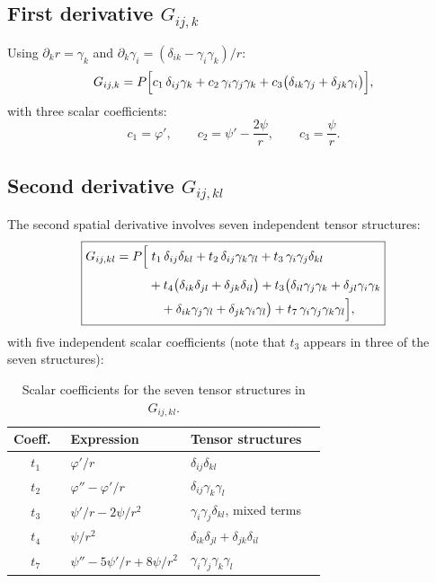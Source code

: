 \documentclass[11pt,a4paper]{article}
\begin{document}
\subsection{First derivative \texorpdfstring{$G_{ij,k}$}{G\_ij,k}}

Using $\partial_k r = \gamma_k$ and
$\partial_k \gamma_i = (\delta_{ik} - \gamma_i\gamma_k)/r$:
\begin{equation}
  G_{ij,k} = P\Bigl[
    c_1\,\delta_{ij}\gamma_k
    + c_2\,\gamma_i\gamma_j\gamma_k
    + c_3\bigl(\delta_{ik}\gamma_j
      + \delta_{jk}\gamma_i\bigr)
  \Bigr],
  \label{eq:Gd}
\end{equation}
with three scalar coefficients:
\begin{equation}
  c_1 = \varphi', \qquad
  c_2 = \psi' - \frac{2\psi}{r}, \qquad
  c_3 = \frac{\psi}{r}.
  \label{eq:c123}
\end{equation}

\subsection{Second derivative \texorpdfstring{$G_{ij,kl}$}{G\_ij,kl}}

The second spatial derivative involves seven independent tensor
structures:
\begin{equation}
  \boxed{
  \begin{aligned}
    G_{ij,kl} = P\Bigl[
    &\;t_1\,\delta_{ij}\delta_{kl}
    + t_2\,\delta_{ij}\gamma_k\gamma_l
    + t_3\,\gamma_i\gamma_j\delta_{kl} \\[4pt]
    &+ t_4\bigl(\delta_{ik}\delta_{jl}
      + \delta_{jk}\delta_{il}\bigr)
    + t_3\bigl(\delta_{il}\gamma_j\gamma_k
      + \delta_{jl}\gamma_i\gamma_k \\
    &\quad + \delta_{ik}\gamma_j\gamma_l
      + \delta_{jk}\gamma_i\gamma_l\bigr)
    + t_7\,\gamma_i\gamma_j\gamma_k\gamma_l
    \Bigr],
  \end{aligned}
  }
  \label{eq:Gdd}
\end{equation}
with five independent scalar coefficients (note that $t_3$ appears
in three of the seven structures):

\begin{table}[ht]
\centering
\caption{Scalar coefficients for the seven tensor structures
  in $G_{ij,kl}$.}
\label{tab:Gdd_coeffs}
\begin{tabular}{@{}clll@{}}
\toprule
Coeff.\ & Expression & Tensor structures \\
\midrule
$t_1$ & $\varphi'/r$
  & $\delta_{ij}\delta_{kl}$ \\[4pt]
$t_2$ & $\varphi'' - \varphi'/r$
  & $\delta_{ij}\gamma_k\gamma_l$ \\[4pt]
$t_3$ & $\psi'/r - 2\psi/r^2$
  & $\gamma_i\gamma_j\delta_{kl}$, \;4 mixed terms \\[4pt]
$t_4$ & $\psi/r^2$
  & $\delta_{ik}\delta_{jl} + \delta_{jk}\delta_{il}$ \\[4pt]
$t_7$ & $\psi'' - 5\psi'/r + 8\psi/r^2$
  & $\gamma_i\gamma_j\gamma_k\gamma_l$ \\
\bottomrule
\end{tabular}
\end{table}
\end{document}

